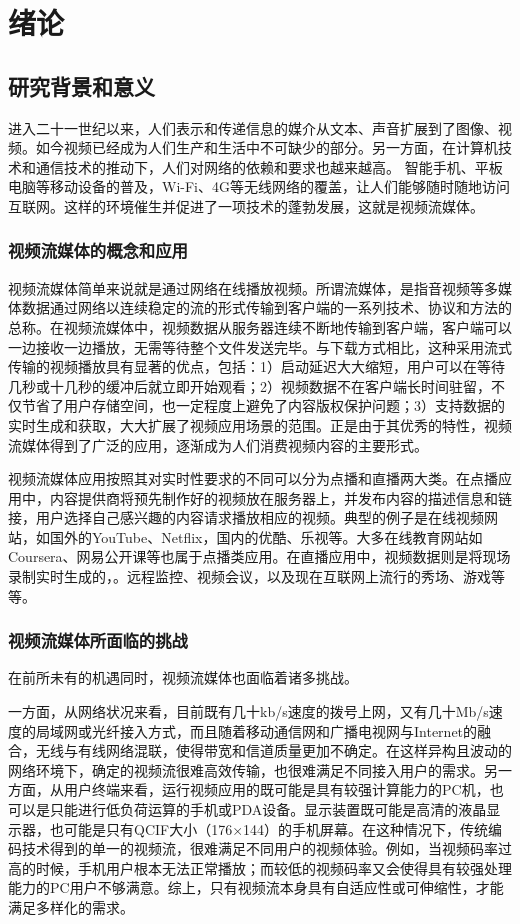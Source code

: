 \chapter{绪论}

\section{研究背景和意义}

进入二十一世纪以来，人们表示和传递信息的媒介从文本、声音扩展到了图像、视频。如今视频已经成为人们生产和生活中不可缺少的部分。另一方面，在计算机技术和通信技术的推动下，人们对网络的依赖和要求也越来越高。
智能手机、平板电脑等移动设备的普及，Wi-Fi、4G等无线网络的覆盖，让人们能够随时随地访问互联网。这样的环境催生并促进了一项技术的蓬勃发展，这就是视频流媒体。

\subsection{视频流媒体的概念和应用}

视频流媒体简单来说就是通过网络在线播放视频。所谓流媒体，是指音视频等多媒体数据通过网络以连续稳定的流的形式传输到客户端的一系列技术、协议和方法的总称。在视频流媒体中，视频数据从服务器连续不断地传输到客户端，客户端可以一边接收一边播放，无需等待整个文件发送完毕。与下载方式相比，这种采用流式传输的视频播放具有显著的优点，包括：1）启动延迟大大缩短，用户可以在等待几秒或十几秒的缓冲后就立即开始观看；2）视频数据不在客户端长时间驻留，不仅节省了用户存储空间，也一定程度上避免了内容版权保护问题；3）支持数据的实时生成和获取，大大扩展了视频应用场景的范围。正是由于其优秀的特性，视频流媒体得到了广泛的应用，逐渐成为人们消费视频内容的主要形式。

视频流媒体应用按照其对实时性要求的不同可以分为点播和直播两大类。在点播应用中，内容提供商将预先制作好的视频放在服务器上，并发布内容的描述信息和链接，用户选择自己感兴趣的内容请求播放相应的视频。典型的例子是在线视频网站，如国外的YouTube、Netflix，国内的优酷、乐视等。大多在线教育网站如Coursera、网易公开课等也属于点播类应用。在直播应用中，视频数据则是将现场录制实时生成的，。远程监控、视频会议，以及现在互联网上流行的秀场、游戏等等。

\subsection{视频流媒体所面临的挑战}

在前所未有的机遇同时，视频流媒体也面临着诸多挑战。

一方面，从网络状况来看，目前既有几十kb/s速度的拨号上网，又有几十Mb/s速度的局域网或光纤接入方式，而且随着移动通信网和广播电视网与Internet的融合，无线与有线网络混联，使得带宽和信道质量更加不确定。在这样异构且波动的网络环境下，确定的视频流很难高效传输，也很难满足不同接入用户的需求。另一方面，从用户终端来看，运行视频应用的既可能是具有较强计算能力的PC机，也可以是只能进行低负荷运算的手机或PDA设备。显示装置既可能是高清的液晶显示器，也可能是只有QCIF大小（176×144）的手机屏幕。在这种情况下，传统编码技术得到的单一的视频流，很难满足不同用户的视频体验。例如，当视频码率过高的时候，手机用户根本无法正常播放；而较低的视频码率又会使得具有较强处理能力的PC用户不够满意。综上，只有视频流本身具有自适应性或可伸缩性，才能满足多样化的需求。

